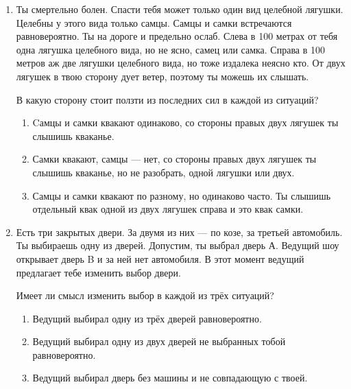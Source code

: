 \documentclass[12pt]{article}
\begin{document}
\begin{enumerate}
    \item Ты смертельно болен. Спасти тебя может только один вид  целебной лягушки. Целебны у этого вида только самцы. Самцы и самки встречаются равновероятно. Ты на дороге и предельно ослаб. Слева в 100 метрах от тебя одна лягушка целебного вида, но не ясно, самец или самка. Справа в 100 метров аж две лягушки целебного вида, но тоже издалека неясно кто. От двух лягушек в твою сторону дует ветер, поэтому ты можешь их слышать.

В какую сторону стоит ползти из последних сил в каждой из  ситуаций?
\begin{enumerate}
  \item Cамцы и самки квакают одинаково, со стороны правых двух лягушек ты слышишь кваканье.
  \item Самки квакают, самцы — нет, со стороны правых двух лягушек ты слышишь кваканье, но не разобрать, одной лягушки или двух.
  \item Самцы и самки квакают по разному, но одинаково часто. Ты слышишь отдельный квак одной из двух лягушек справа и это квак самки.
\end{enumerate}

\item 
Есть три закрытых двери. За двумя из них — по козе, за третьей автомобиль. Ты выбираешь одну из дверей. Допустим, ты выбрал дверь А. Ведущий шоу открывает дверь B и за ней нет автомобиля.
В этот момент ведущий предлагает тебе изменить выбор двери.

Имеет ли смысл изменить выбор в каждой из трёх ситуаций?
\begin{enumerate}
  \item Ведущий выбирал одну из трёх дверей равновероятно.
  \item Ведущий выбирал одну из двух дверей не выбранных тобой равновероятно.
  \item Ведущий выбирал дверь без машины и не совпадающую с твоей.
\end{enumerate}


\end{enumerate}

\newpage
\end{document}
